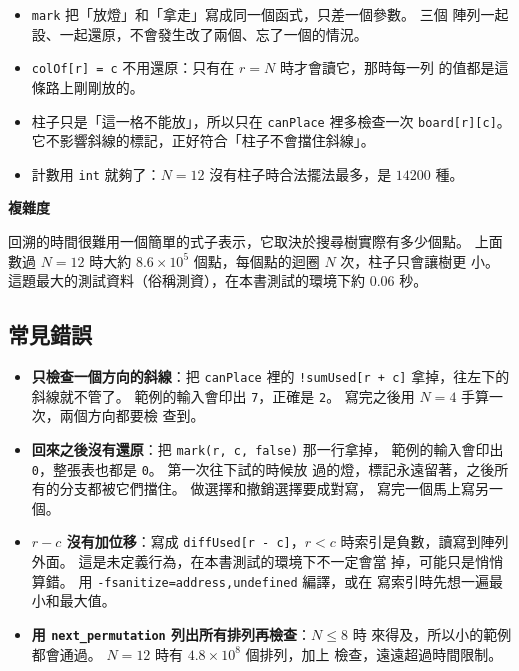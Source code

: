 
\begin{itemize}
\item \texttt{mark} 把「放燈」和「拿走」寫成同一個函式，只差一個參數。 三個
陣列一起設、一起還原，不會發生改了兩個、忘了一個的情況。
\item \texttt{colOf[r] = c} 不用還原：只有在 $r = N$ 時才會讀它，那時每一列
的值都是這條路上剛剛放的。
\item 柱子只是「這一格不能放」，所以只在 \texttt{canPlace} 裡多檢查一次
\texttt{board[r][c]}。 它不影響斜線的標記，正好符合「柱子不會擋住斜線」。
\item 計數用 \texttt{int} 就夠了：$N = 12$ 沒有柱子時合法擺法最多，是
$14200$ 種。
\end{itemize}

\textbf{複雜度}

回溯的時間很難用一個簡單的式子表示，它取決於搜尋樹實際有多少個點。 上面數過
$N = 12$ 時大約 $8.6 \times 10^5$ 個點，每個點的迴圈 $N$ 次，柱子只會讓樹更
小。 這題最大的測試資料（俗稱測資），在本書測試的環境下約 $0.06$ 秒。

\subsection{常見錯誤}

\begin{itemize}
\item \textbf{只檢查一個方向的斜線}：把 \texttt{canPlace} 裡的
\texttt{!sumUsed[r + c]} 拿掉，往左下的斜線就不管了。 範例的輸入會印出
\texttt{7}，正確是 \texttt{2}。 寫完之後用 $N = 4$ 手算一次，兩個方向都要檢
查到。
\item \textbf{回來之後沒有還原}：把 \texttt{mark(r, c, false)} 那一行拿掉，
範例的輸入會印出 \texttt{0}，整張表也都是 \texttt{0}。 第一次往下試的時候放
過的燈，標記永遠留著，之後所有的分支都被它們擋住。 做選擇和撤銷選擇要成對寫，
寫完一個馬上寫另一個。
\item \textbf{$r - c$ 沒有加位移}：寫成 \texttt{diffUsed[r - c]}，$r < c$
時索引是負數，讀寫到陣列外面。 這是未定義行為，在本書測試的環境下不一定會當
掉，可能只是悄悄算錯。 用 \texttt{-fsanitize=address,undefined} 編譯，或在
寫索引時先想一遍最小和最大值。
\item \textbf{用 \texttt{next\_permutation} 列出所有排列再檢查}：$N \le 8$ 時
來得及，所以小的範例都會通過。 $N = 12$ 時有 $4.8 \times 10^8$ 個排列，加上
檢查，遠遠超過時間限制。
\end{itemize}


